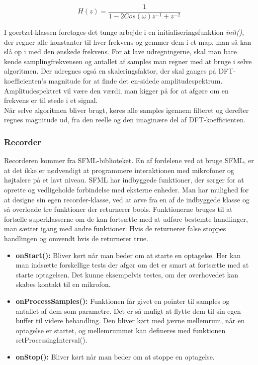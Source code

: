 \begin{equation}\label{eq:transferfunction}
H(z) = \frac{1}{1-2Cos(\omega)z^{-1}+z^{-2}}
\end{equation}


I goertzel-klassen foretages det tunge arbejde i en initialiseringsfunktion \textit{init()}, der regner alle konstanter til hver frekvens og gemmer dem i et map, man så kan slå op i med den ønskede frekvens. For at lave udregningerne, skal man bare kende samplingfrekvensen og antallet af samples man regner med at bruge i selve algoritmen. Der udregnes også en skaleringsfaktor, der skal ganges på DFT-koefficienten's magnitude for at finde det en-sidede amplitudespektrum. Amplitudespektret vil være den værdi, man kigger på for at afgøre om en frekvens er til stede i et signal. \\
Når selve algoritmen bliver brugt, køres alle samples igennem filteret og derefter regnes magnitude ud, fra den reelle og den imaginære del af DFT-koefficienten.





\subsubsection{Recorder}

Recorderen kommer fra SFML-biblioteket. En af fordelene ved at bruge SFML, er at det ikke er nødvendigt at programmere interaktionen med mikrofoner og højtalere på et lavt niveau. SFML har indbyggede funktioner, der sørger for at oprette og vedligeholde forbindelse med eksterne enheder. Man har mulighed for at designe sin egen recorder-klasse, ved at arve fra en af de indbyggede klasse og så overloade tre funktioner der returnerer bools. Funktionerne bruges til at fortælle superklasserne om de kan fortsætte med at udføre bestemte handlinger, man sætter igang med andre funktioner. Hvis de returnerer false stoppes handlingen og omvendt hvis de returnerer true.

\begin{itemize}

\item \textbf{onStart():} Bliver kørt når man beder om at starte en optagelse. Her kan man indsætte forskellige tests der afgør om det er smart at fortsætte med at starte optagelsen. Det kunne eksempelvis testes, om der overhovedet kan skabes kontakt til en mikrofon.

\item \textbf{onProcessSamples():} Funktionen får givet en pointer til samples og antallet af dem som parametre. Det er så muligt at flytte dem til sin egen buffer til videre behandling. Den bliver kørt med jævne mellemrum, når en optagelse er startet, og mellemrummet kan defineres med funktionen setProcessingInterval(). 

\item \textbf{onStop():} Bliver kørt når man beder om at stoppe en optagelse.

\end{itemize}

